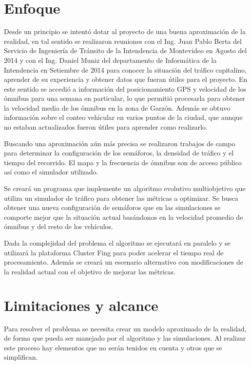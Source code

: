  
\section{Enfoque}

Desde un principio se intentó dotar al proyecto de una buena aproximación de la realidad, en tal sentido se realizaron reuniones con el Ing. Juan Pablo Berta del Servicio de Ingeniería de Tránsito de la Intendencia de Montevideo en Agosto del  2014 y con el Ing. Daniel Muniz del departamento de Informática de la Intendencia en Setiembre de 2014 para conocer la situación del tráfico capitalino, aprender de su experiencia y obtener datos que fueran útiles para el proyecto. En este sentido se accedió a información del posicionamiento GPS y velocidad de los ómnibus para una semana en particular, lo que permitió procesarla para obtener la velocidad media de los ómnibus en la zona de Garzón. Además se obtuvo información sobre el conteo vehicular en varios puntos de la ciudad, que aunque no estaban actualizados fueron útiles para aprender como realizarlo.

Buscando una aproximación aún más precisa se realizaron trabajos de campo para determinar la configuración de los semáforos, la densidad de tráfico y el tiempo del recorrido. El mapa y la frecuencia de ómnibus son de acceso público así como el simulador utilizado.

Se creará un programa que implemente un algoritmo evolutivo multiobjetivo que utiliza un simulador de tráfico para obtener las métricas a optimizar. Se busca obtener una nueva configuración de semáforos que en las simulaciones se comporte mejor que la situación actual basándonos en la velocidad promedio de ómnibus y del resto de los vehículos.

Dada la complejidad del problema el algoritmo se ejecutará en paralelo y se utilizará la plataforma Cluster Fing para poder acelerar el tiempo real de procesamiento. Además se creará un escenario alternativo con modificaciones de la realidad actual con el objetivo de mejorar las métricas.

\section{Limitaciones y alcance}
Para resolver el problema se necesita crear un modelo aproximado de la realidad, de forma que pueda ser manejado por el algoritmo y las simulaciones. Al realizar este proceso hay elementos que no serán tenidos en cuenta y otros que se simplifican. 

